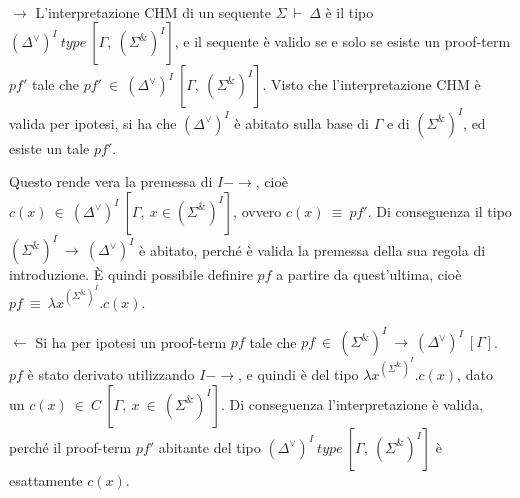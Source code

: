 \proof \mbox{} \\

$\to$ L'interpretazione CHM di un sequente $\Sigma~\vdash~\Delta$ è il tipo $(\Delta^{\vee})^I~type~[\Gamma,~(\Sigma^{\&})^I]$, e il sequente è valido se e solo se esiste un proof-term $pf'$ tale che 
$pf'~\in~(\Delta^{\vee})^I~[\Gamma,~(\Sigma^{\&})^I]$. Visto che l'interpretazione CHM è valida per ipotesi, si ha che $(\Delta^{\vee})^I$ è abitato sulla base di $\Gamma$ e di $(\Sigma^{\&})^I$, ed esiste un tale $pf'$.

Questo rende vera la premessa di $I-\to$, cioè $c(x)~\in~(\Delta^{\vee})^I~[\Gamma,~x\in(\Sigma^{\&})^I]$, ovvero $c(x)~\equiv~pf'$. Di conseguenza il tipo $(\Sigma^{\&})^I~\to~(\Delta^{\vee})^I$ è abitato, perché è valida la premessa della sua regola di introduzione. È quindi possibile definire $pf$ a partire da quest'ultima, cioè $pf~\equiv~\lambda x^{(\Sigma^{\&})^I}.c(x)$.

\vspace{0.2in}
$\leftarrow$ Si ha per ipotesi un proof-term $pf$ tale che $pf~\in~(\Sigma^{\&})^I~\to~(\Delta^{\vee})^I~[\Gamma]$. $pf$ è stato derivato utilizzando $I-\to$, e quindi è del tipo $\lambda x^{(\Sigma^{\&})^I}.c(x)$, dato un $c(x)~\in~C~[\Gamma,~x~\in~(\Sigma^{\&})^I]$. Di conseguenza l'interpretazione è valida, perché il proof-term $pf'$ abitante del tipo 
$(\Delta^{\vee})^I~type~[\Gamma,~(\Sigma^{\&})^I]$ è esattamente $c(x)$.

\endproof
